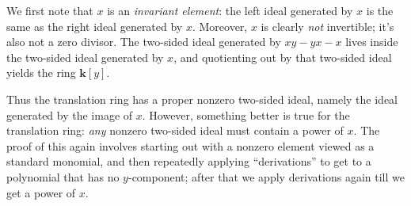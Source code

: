 \documentclass[a4paper]{amsart}
\newcommand{\field}{\mathbf{k}}
\begin{document}
We first note that $x$ is an {\em invariant element}: the left ideal
generated by $x$ is the same as the right ideal generated by
$x$. Moreover, $x$ is clearly {\em not} invertible; it's also not a
zero divisor. The two-sided ideal generated by $xy - yx - x$ lives
inside the two-sided ideal generated by $x$, and quotienting out by
that two-sided ideal yields the ring $\field[y]$.

Thus the translation ring has a proper nonzero two-sided ideal, namely
the ideal generated by the image of $x$. However, something better is
true for the translation ring: {\em any} nonzero two-sided ideal must
contain a power of $x$. The proof of this again involves starting out
with a nonzero element viewed as a standard monomial, and then
repeatedly applying ``derivations'' to get to a polynomial that has no
$y$-component; after that we apply derivations again till we get a
power of $x$.

\printindex
\end{document}

